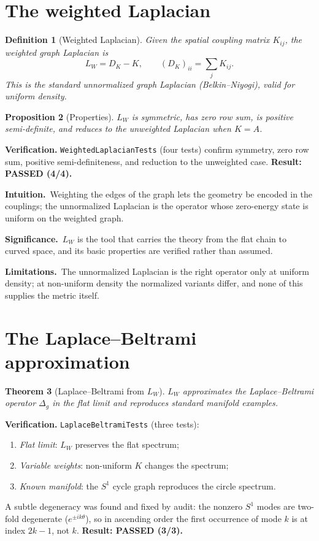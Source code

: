 \documentclass[10pt,twoside,openany]{book}
\newtheorem{theorem}{Theorem}[chapter]
\newtheorem{proposition}[theorem]{Proposition}
\newtheorem{definition}[theorem]{Definition}
\newcommand{\theoremnotes}[3]{%
  \par\medskip\noindent
  \textbf{Intuition.}\ #1\par
  \textbf{Significance.}\ #2\par
  \textbf{Limitations.}\ #3\par}
\begin{document}
\section{The weighted Laplacian}

\begin{definition}[Weighted Laplacian]
Given the spatial coupling matrix $K_{ij}$, the weighted graph Laplacian is
\begin{equation}
L_W = D_K - K,
\qquad (D_K)_{ii} = \sum_j K_{ij}.
\end{equation}
This is the standard \emph{unnormalized} graph Laplacian (Belkin--Niyogi), valid for
uniform density.
\end{definition}

\begin{proposition}[Properties]
$L_W$ is symmetric, has zero row sum, is positive semi-definite, and reduces to the
unweighted Laplacian when $K=A$.
\end{proposition}

\textbf{Verification.} \texttt{WeightedLaplacianTests} (four tests) confirm symmetry, zero
row sum, positive semi-definiteness, and reduction to the unweighted case.
\textbf{Result: PASSED (4/4).}

\theoremnotes
{Weighting the edges of the graph lets the geometry be encoded in the couplings; the
unnormalized Laplacian is the operator whose zero-energy state is uniform on the weighted
graph.}
{$L_W$ is the tool that carries the theory from the flat chain to curved space, and its
basic properties are verified rather than assumed.}
{The unnormalized Laplacian is the right operator only at uniform density; at
non-uniform density the normalized variants differ, and none of this supplies the metric
itself.}

\section{The Laplace--Beltrami approximation}
\label{ch:laplace-beltrami}

\begin{theorem}[Laplace--Beltrami from $L_W$]
$L_W$ approximates the Laplace--Beltrami operator $\Delta_g$ in the flat limit and
reproduces standard manifold examples.
\end{theorem}

\textbf{Verification.} \texttt{LaplaceBeltramiTests} (three tests):
\begin{enumerate}
\item \emph{Flat limit}: $L_W$ preserves the flat spectrum;
\item \emph{Variable weights}: non-uniform $K$ changes the spectrum;
\item \emph{Known manifold}: the $S^1$ cycle graph reproduces the circle spectrum.
\end{enumerate}
A subtle degeneracy was found and fixed by audit: the nonzero $S^1$ modes are two-fold
degenerate ($e^{\pm ik\theta}$), so in ascending order the first occurrence of mode $k$ is
at index $2k-1$, not $k$. \textbf{Result: PASSED (3/3).}
\end{document}
